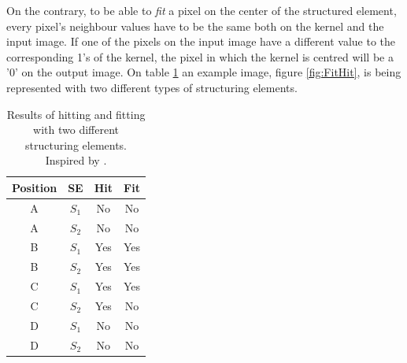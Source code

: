 On the contrary, to be able to \textit{fit} a pixel on the center of the structured element, every pixel's neighbour values have to be the same both on the kernel and the input image. If one of the pixels on the input image have a different value to the corresponding 1's of the kernel, the pixel in which the kernel is centred will be a '0' on the output image. On table \ref{tab:HitFitResults} an example image, figure \ref{fig:FitHit}, is being represented with two different types of structuring elements.
\begin{table}[htbp]
\centering
\begin{tabular}{|c|c|c|c|}
\hline
 \:Position\: &SE &\:\:\:Hit\:\:\: &\:\:\:Fit\:\:\: \\\hline
 \hline
 A &$S_{1}$ &No &No\\\hline
 A &$S_{2}$ &No &No\\\hline
 B &$S_{1}$ &Yes &Yes\\\hline
 B &$S_{2}$ &Yes &Yes\\\hline
 C &$S_{1}$ &Yes &Yes\\\hline
 C &$S_{2}$ &Yes &No\\\hline
 D &$S_{1}$ &No &No\\\hline
 D &$S_{2}$ &No &No\\\hline
\end{tabular}
\caption{Results of hitting and fitting with two different structuring elements. Inspired by \citep{ip_book}.}
\label{tab:HitFitResults}
\end{table}

